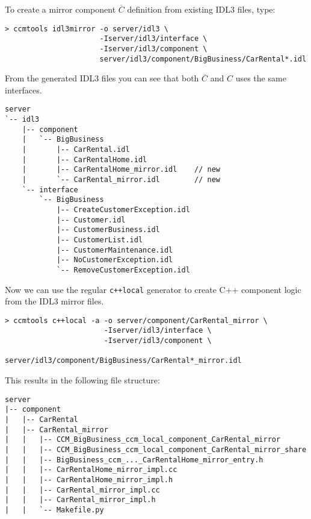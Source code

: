 To create a mirror component $\overline{C}$ definition from existing
IDL3 files, type:
\begin{small}
\begin{verbatim}
> ccmtools idl3mirror -o server/idl3 \
                      -Iserver/idl3/interface \
                      -Iserver/idl3/component \
                      server/idl3/component/BigBusiness/CarRental*.idl
\end{verbatim}
\end{small}

From the generated IDL3 files you can see that both $\overline{C}$ and $C$ 
uses the same interfaces.
\begin{small}
\begin{verbatim}
server
`-- idl3
    |-- component
    |   `-- BigBusiness
    |       |-- CarRental.idl
    |       |-- CarRentalHome.idl
    |       |-- CarRentalHome_mirror.idl    // new
    |       `-- CarRental_mirror.idl        // new
    `-- interface
        `-- BigBusiness
            |-- CreateCustomerException.idl
            |-- Customer.idl
            |-- CustomerBusiness.idl
            |-- CustomerList.idl
            |-- CustomerMaintenance.idl
            |-- NoCustomerException.idl
            `-- RemoveCustomerException.idl
\end{verbatim}
\end{small}

Now we can use the regular {\tt c++local} generator to create C++ component 
logic from the IDL3 mirror files.
\begin{small}
\begin{verbatim}
> ccmtools c++local -a -o server/component/CarRental_mirror \
                       -Iserver/idl3/interface \
                       -Iserver/idl3/component \
                       server/idl3/component/BigBusiness/CarRental*_mirror.idl
\end{verbatim}
\end{small}
This results in the following file structure:
\begin{small}
\begin{verbatim}
server
|-- component
|   |-- CarRental
|   |-- CarRental_mirror
|   |   |-- CCM_BigBusiness_ccm_local_component_CarRental_mirror
|   |   |-- CCM_BigBusiness_ccm_local_component_CarRental_mirror_share
|   |   |-- BigBusiness_ccm_..._CarRentalHome_mirror_entry.h
|   |   |-- CarRentalHome_mirror_impl.cc
|   |   |-- CarRentalHome_mirror_impl.h
|   |   |-- CarRental_mirror_impl.cc
|   |   |-- CarRental_mirror_impl.h
|   |   `-- Makefile.py
\end{verbatim}
\end{small}

